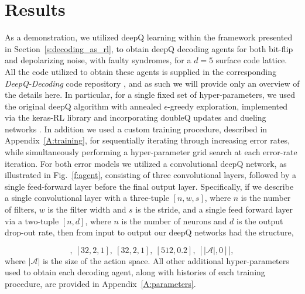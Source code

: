 \documentclass[twocolumn,preprintnumbers,amsmath,amssymb,notitlepage,nofootinbib,longbibliography,superscriptaddress,aps,pra,10pt]{revtex4-1}
\begin{document}
\section{Results}\label{s:results}

	As a demonstration, we utilized deepQ learning within the framework presented in Section~\ref{s:decoding_as_rl}, to obtain deepQ decoding agents for both bit-flip and depolarizing noise, with faulty syndromes, for a $d=5$ surface code lattice.
	All the code utilized to obtain these agents is supplied in the corresponding \textit{DeepQ-Decoding} code repository \cite{DeepQDecoding}, and as such we will provide only an overview of the details here.
	In particular, for a single fixed set of hyper-parameters, we used the original deepQ algorithm \cite{RLMnih15}with annealed $\epsilon$-greedy exploration, implemented via the keras-RL library \cite{plappert2016kerasrl} and incorporating doubleQ updates \cite{RLvan2016deep} and dueling networks \cite{RLwang2015dueling}.
	In addition we used a custom training procedure, described in Appendix~\ref{A:training}, for sequentially iterating through increasing error rates, while simultaneously performing a hyper-parameter grid search at each error-rate iteration.
	For both error models we utilized a convolutional deepQ network, as illustrated in Fig.~\ref{f:agent}, consisting of three convolutional layers, followed by a single feed-forward layer before the final output layer.
	Specifically, if we describe a single convolutional layer with a three-tuple $[n,w,s]$, where $n$ is the number of filters, $w$ is the filter width and $s$ is the stride, and a single feed forward layer via a two-tuple $[n,d]$, where $n$ is the number of neurons and $d$ is the output drop-out rate, then from input to output our deepQ networks had the structure,


	\begin{equation}
		[[64,3,2],~[32,2,1],~[32,2,1],~[512,0.2],~[|\mathcal{A}|, 0]],
	\end{equation}
	where $|\mathcal{A}|$ is the size of the action space.
	All other additional hyper-parameters used to obtain each decoding agent, along with histories of each training procedure, are provided in Appendix~\ref{A:parameters}.
\end{document}
